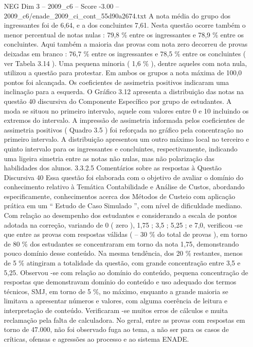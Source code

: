 \begin{textsample}{NEG Dim 3 – 2009\_c6 – Score -3.00 – 2009\_c6/enade\_2009\_ci\_cont\_55d90a2674.txt}
A nota média do grupo dos ingressantes foi de 6,64, e a dos concluintes 7,61.
Nesta questão ocorre também o menor percentual de notas nulas : 79,8 \% entre os ingressantes e 78,9 \% entre os concluintes.
Aqui também a maioria das provas com nota zero decorreu de provas deixadas em branco : 76,7 \% entre os ingressantes e 78,5 \% entre os concluintes ( ver Tabela 3.14 ).
Uma pequena minoria ( 1,6 \% ), dentre aqueles com nota nula, utilizou a questão para protestar.
Em ambos os grupos a nota máxima de 100,0 pontos foi alcançada.
Os coeficientes de assimetria positivos indicaram uma inclinação para a esquerda.
O Gráfico 3.12 apresenta a distribuição das notas na questão 40 discursiva do Componente Específico por grupo de estudantes.
A moda se situou no primeiro intervalo, aquele com valores entre 0 e 10 incluindo os extremos do intervalo.
A impressão de assimetria informada pelos coeficientes de assimetria positivos ( Quadro 3.5 ) foi reforçada no gráfico pela concentração no primeiro intervalo.
A distribuição apresentou um outro máximo local no terceiro e quinto intervalo para os ingressantes e concluintes, respectivamente, indicando uma ligeira simetria entre as notas não nulas, mas não polarização das habilidades dos alunos. 3.3.2.5 Comentários sobre as respostas à Questão Discursiva 40 Essa questão foi elaborada com o objetivo de avaliar o domínio do conhecimento relativo à Temática Contabilidade e Análise de Custos, abordando especificamente, conhecimentos acerca dos Métodos de Custeio com aplicação prática em um “ Estudo de Caso Simulado ”, com nível de dificuldade mediano.
Com relação ao desempenho dos estudantes e considerando a escala de pontos adotada na correção, variando de 0 ( zero ), 1,75 ; 3,5 ; 5,25 ; e 7,0, verificou -se que entre as provas com respostas válidas ( – 30 \% do total de provas ), em torno de 80 \% dos estudantes se concentraram em torno da nota 1,75, demonstrando pouco domínio desse conteúdo.
Na mesma tendência, dos 20 \% restantes, menos de 5 \% atingiram a totalidade da questão, com grande concentração entre 3,5 e 5,25.
Observou -se com relação ao domínio do conteúdo, pequena concentração de respostas que demonstravam domínio do conteúdo e uso adequado dos termos técnicos, SMJ, em torno de 5 \%, no máximo, enquanto a grande maioria se limitava a apresentar números e valores, com alguma coerência de leitura e interpretação de conteúdo.
Verificaram -se muitos erros de cálculos e muita reclamação pela falta de calculadora.
No geral, entre as provas com respostas em torno de 47.000, não foi observado fuga ao tema, a não ser para os casos de críticas, ofensas e agressões ao processo e ao sistema ENADE.

\end{textsample}
